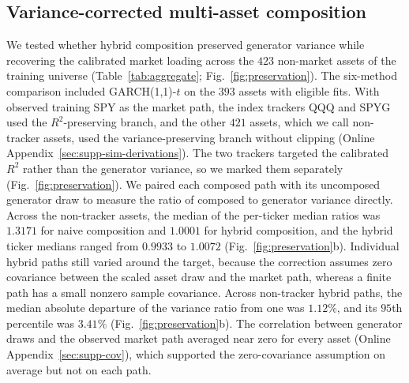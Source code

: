 
\subsection{Variance-corrected multi-asset composition}

We tested whether hybrid composition preserved generator variance
while recovering the calibrated market loading across the $423$
non-market assets of the training universe
(Table~\ref{tab:aggregate}; Fig.~\ref{fig:preservation}). The six-method
comparison included GARCH(1,1)-$t$ on the $393$ assets with eligible
fits. With observed training SPY as the market path, the index trackers QQQ
and SPYG used the $R^2$-preserving branch, and the other $421$ assets,
which we call non-tracker assets, used the variance-preserving branch
without clipping (Online Appendix~\ref{sec:supp-sim-derivations}). The two trackers targeted
the calibrated $R^2$ rather than the generator variance, so we marked
them separately (Fig.~\ref{fig:preservation}). We paired each composed
path with its uncomposed generator draw to measure the ratio of
composed to generator variance directly. Across the non-tracker
assets, the median of the per-ticker median ratios was $1.3171$ for
naive composition and $1.0001$ for hybrid composition, and the hybrid
ticker medians ranged from $0.9933$ to $1.0072$
(Fig.~\ref{fig:preservation}b). Individual hybrid paths still varied
around the target, because the correction assumes zero covariance
between the scaled asset draw and the market path, whereas a finite
path has a small nonzero sample covariance. Across non-tracker hybrid
paths, the median absolute departure of the variance ratio from one
was $1.12\%$, and its $95$th percentile was $3.41\%$
(Fig.~\ref{fig:preservation}b). The correlation between generator
draws and the observed market path averaged near zero for every asset
(Online Appendix~\ref{sec:supp-cov}), which supported the zero-covariance
assumption on average but not on each path.



